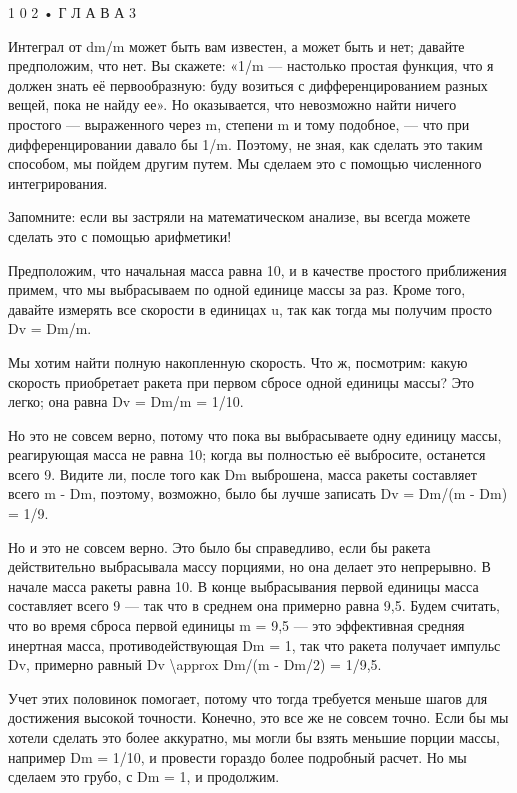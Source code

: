 \documentclass[10pt,oneside]{article}
\newcommand{\TipsSubsection}[1]{\par\vspace{6bp}{\normalsize\bfseries #1\par}\vspace{2bp}}
\begin{document}
1 0 2 • Г Л А В А  3\par

Интеграл от dm/m может быть вам известен, а может быть и нет; давайте предположим, что нет. Вы скажете: «1/m --- настолько простая функция, что я должен знать её первообразную: буду возиться с дифференцированием разных вещей, пока не найду ее». Но оказывается, что невозможно найти ничего простого --- выраженного через m, степени m и тому подобное, --- что при дифференцировании давало бы 1/m. Поэтому, не зная, как сделать это таким способом, мы пойдем другим путем. Мы сделаем это с помощью численного интегрирования.\par

Запомните: если вы застряли на математическом анализе, вы всегда можете сделать это с помощью арифметики!\par

\TipsSubsection{3-4 Численное интегрирование}

Предположим, что начальная масса равна 10, и в качестве простого приближения примем, что мы выбрасываем по одной единице массы за раз. Кроме того, давайте измерять все скорости в единицах u, так как тогда мы получим просто Dv = Dm/m.\par

Мы хотим найти полную накопленную скорость. Что ж, посмотрим: какую скорость приобретает ракета при первом сбросе одной единицы массы? Это легко; она равна Dv = Dm/m = 1/10.\par

Но это не совсем верно, потому что пока вы выбрасываете одну единицу массы, реагирующая масса не равна 10; когда вы полностью её выбросите, останется всего 9. Видите ли, после того как Dm выброшена, масса ракеты составляет всего m - Dm, поэтому, возможно, было бы лучше записать Dv = Dm/(m - Dm) = 1/9.\par

Но и это не совсем верно. Это было бы справедливо, если бы ракета действительно выбрасывала массу порциями, но она делает это непрерывно. В начале масса ракеты равна 10. В конце выбрасывания первой единицы масса составляет всего 9 --- так что в среднем она примерно равна 9,5. Будем считать, что во время сброса первой единицы m = 9,5 --- это эффективная средняя инертная масса, противодействующая Dm = 1, так что ракета получает импульс Dv, примерно равный Dv \textbackslash{}approx Dm/(m - Dm/2) = 1/9,5.\par

Учет этих половинок помогает, потому что тогда требуется меньше шагов для достижения высокой точности. Конечно, это все же не совсем точно. Если бы мы хотели сделать это более аккуратно, мы могли бы взять меньшие порции массы, например Dm = 1/10, и провести гораздо более подробный расчет. Но мы сделаем это грубо, с Dm = 1, и продолжим.\par
\end{document}
